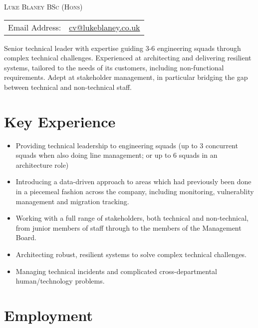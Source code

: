 \documentclass[a4paper]{article}
\newenvironment{detail}{\begin{adjustwidth}{10pt}{}}{\end{adjustwidth}}
\begin{document}
\begin{center}\textsc{\LARGE Luke Blaney BSc (Hons)}\end{center}

\begin{tabular}{ l l }

Email Address: & \href{mailto:cv@lukeblaney.co.uk}{cv@lukeblaney.co.uk}\\

\end{tabular}


\begin{detail}
Senior technical leader with expertise guiding 3-6 engineering squads through complex technical challenges.  Experienced at architecting and delivering resilient systems, tailored to the needs of its customers, including non-functional requirements.  Adept at stakeholder management, in particular bridging the gap between technical and non-technical staff.
\end{detail}

\section*{Key Experience}

\begin{itemize}
	\item Providing technical leadership to engineering squads (up to 3 concurrent squads when also doing line management; or up to 6 squads in an architecture role)
	\item Introducing a data-driven approach to areas which had previously been done in a piecemeal fashion across the company, including monitoring, vulnerablity management and migration tracking.
	\item Working with a full range of stakeholders, both technical and non-technical, from junior members of staff through to the members of the Management Board.
	\item Architecting robust, resilient systems to solve complex technical challenges.
	\item Managing technical incidents and complicated cross-departmental human/technology problems.
\end{itemize}
\section*{Employment}
\end{document}
